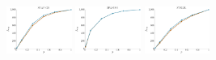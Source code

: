 \documentclass[a4paper]{report}
\newcommand{\wratio}{0.16}
\begin{document}
\includegraphics[width=\wratio\textwidth]{influence/SNAP_GR/fs_snap_gr}\hfill
\includegraphics[width=\wratio\textwidth]{influence/SPANISH/fs_spanish}\hfill
\includegraphics[width=\wratio\textwidth]{influence/STELZL/fs_stelzl}\hfill
\end{document}
